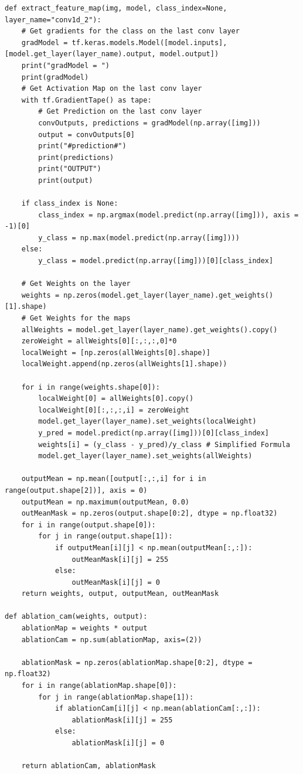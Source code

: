 \documentclass[conference]{IEEEtran}
\begin{document}
\begin{lstlisting}
def extract_feature_map(img, model, class_index=None, layer_name="conv1d_2"):
    # Get gradients for the class on the last conv layer
    gradModel = tf.keras.models.Model([model.inputs],[model.get_layer(layer_name).output, model.output])
    print("gradModel = ")
    print(gradModel)
    # Get Activation Map on the last conv layer
    with tf.GradientTape() as tape:
        # Get Prediction on the last conv layer
        convOutputs, predictions = gradModel(np.array([img]))
        output = convOutputs[0]
        print("#prediction#")
        print(predictions)
        print("OUTPUT")
        print(output)
    
    if class_index is None:
        class_index = np.argmax(model.predict(np.array([img])), axis = -1)[0]
        y_class = np.max(model.predict(np.array([img])))
    else:
        y_class = model.predict(np.array([img]))[0][class_index]

    # Get Weights on the layer
    weights = np.zeros(model.get_layer(layer_name).get_weights()[1].shape)
    # Get Weights for the maps
    allWeights = model.get_layer(layer_name).get_weights().copy()
    zeroWeight = allWeights[0][:,:,:,0]*0
    localWeight = [np.zeros(allWeights[0].shape)]
    localWeight.append(np.zeros(allWeights[1].shape))

    for i in range(weights.shape[0]):
        localWeight[0] = allWeights[0].copy()
        localWeight[0][:,:,:,i] = zeroWeight
        model.get_layer(layer_name).set_weights(localWeight)
        y_pred = model.predict(np.array([img]))[0][class_index]
        weights[i] = (y_class - y_pred)/y_class # Simplified Formula
        model.get_layer(layer_name).set_weights(allWeights)

    outputMean = np.mean([output[:,:,i] for i in range(output.shape[2])], axis = 0)
    outputMean = np.maximum(outputMean, 0.0)
    outMeanMask = np.zeros(output.shape[0:2], dtype = np.float32)
    for i in range(output.shape[0]):
        for j in range(output.shape[1]):
            if outputMean[i][j] < np.mean(outputMean[:,:]):
                outMeanMask[i][j] = 255
            else:
                outMeanMask[i][j] = 0
    return weights, output, outputMean, outMeanMask

def ablation_cam(weights, output):
    ablationMap = weights * output
    ablationCam = np.sum(ablationMap, axis=(2))

    ablationMask = np.zeros(ablationMap.shape[0:2], dtype = np.float32)
    for i in range(ablationMap.shape[0]):
        for j in range(ablationMap.shape[1]):
            if ablationCam[i][j] < np.mean(ablationCam[:,:]):
                ablationMask[i][j] = 255
            else:
                ablationMask[i][j] = 0
    
    return ablationCam, ablationMask
\end{lstlisting}
\end{document}
